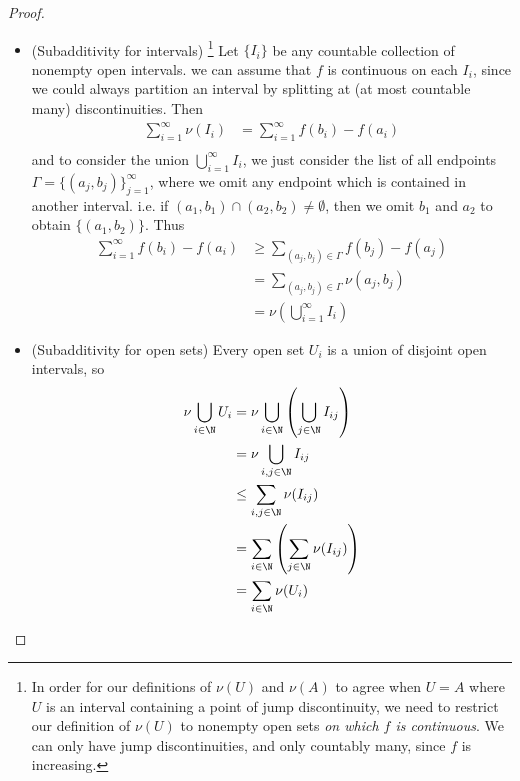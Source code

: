 \documentclass[12pt,letterpaper]{article}
\begin{document}
\begin{proof}
\begin{itemize}
\vfill	
\pagebreak
\item (Subadditivity for intervals)%
\footnote{In order for our definitions of $\nu(U)$ and $\nu(A)$ to agree when $U=A$ where $U$ is an interval containing a point of jump discontinuity, we need to restrict our definition of $\nu(U)$ to nonempty open sets \emph{on which $f$ is continuous}. We can only have jump discontinuities, and only countably many, since $f$ is increasing.} 
Let $\{I_i\}$ be any countable collection of nonempty open intervals. \WLOG{} we can assume that $f$ is continuous on each $I_i$, since we could always partition an interval by splitting at (at most countable many) discontinuities. Then 
\begin{align*}
\sum_{i=1}^\infty \nu(I_i) &= \sum_{i=1}^\infty f(b_i)-f(a_i)  \\
\end{align*}
and to consider the union $\bigcup_{i=1}^\infty I_i$, we just consider the list of all endpoints $\Gamma=\{(a_j,b_j)\}_{j=1}^\infty$, where we omit any endpoint which is contained in another interval. i.e. if $(a_1,b_1)\cap(a_2,b_2)\neq\emptyset$, then we omit $b_1$ and $a_2$ to obtain $\{(a_1,b_2)\}$. Thus 
\begin{align*}
 \sum_{i=1}^\infty f(b_i)-f(a_i) 
&\geq \sum_{(a_j,b_j)\in\Gamma} f(b_j)-f(a_j) \\
&=\sum_{(a_j,b_j)\in\Gamma} \nu(a_j,b_j) \\
&=\nu\left (\bigcup_{i=1}^\infty I_i \right )
\end{align*}
\item (Subadditivity for open sets) Every open set $U_i$ is a union of disjoint open intervals, so 
\begin{align*}
\nu\bigcup_{i\in\N} U_i &= \nu \bigcup_{i\in\N} \left (\bigcup_{j\in\N} I_{ij}\right ) \\
&= \nu\bigcup_{i,j\in\N} I_{ij} \\
&\leq \sum_{i,j\in\N} \nu(I_{ij}) \\
&= \sum_{i\in\N} \left (\sum_{j\in\N} \nu(I_{ij})\right ) \\
&= \sum_{i\in\N} \nu(U_i)
\end{align*}


\end{itemize}
\end{proof}
\end{document}
